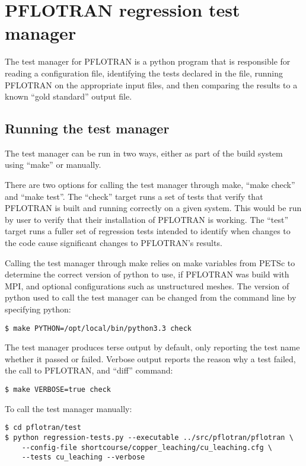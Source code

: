\section{PFLOTRAN regression test manager}

The test manager for PFLOTRAN is a python program that is responsible
for reading a configuration file, identifying the tests declared in
the file, running PFLOTRAN on the appropriate input files, and then
comparing the results to a known ``gold standard'' output file.

\subsection{Running the test manager}
The test manager can be run in two ways, either as part of the build
system using ``make'' or manually.

There are two options for calling the test manager through make,
``make check'' and ``make test''. The ``check'' target runs a set of
tests that verify that PFLOTRAN is built and running correctly on a
given system. This would be run by user to verify that their
installation of PFLOTRAN is working. The ``test'' target runs a fuller
set of regression tests intended to identify when changes to the code
cause significant changes to PFLOTRAN's results.

Calling the test manager through make relies on make variables from
PETSc to determine the correct version of python to use, if PFLOTRAN
was build with MPI, and optional configurations such as unstructured
meshes. The version of python used to call the test manager can be
changed from the command line by specifying python:

\begin{verbatim}
$ make PYTHON=/opt/local/bin/python3.3 check
\end{verbatim}

The test manager produces terse output by default, only reporting the
test name whether it passed or failed. Verbose output reports the
reason why a test failed, the call to PFLOTRAN, and ``diff'' command:

\begin{verbatim}
$ make VERBOSE=true check
\end{verbatim}

To call the test manager manually:
\begin{verbatim}
$ cd pflotran/test
$ python regression-tests.py --executable ../src/pflotran/pflotran \
    --config-file shortcourse/copper_leaching/cu_leaching.cfg \
    --tests cu_leaching --verbose
\end{verbatim}

